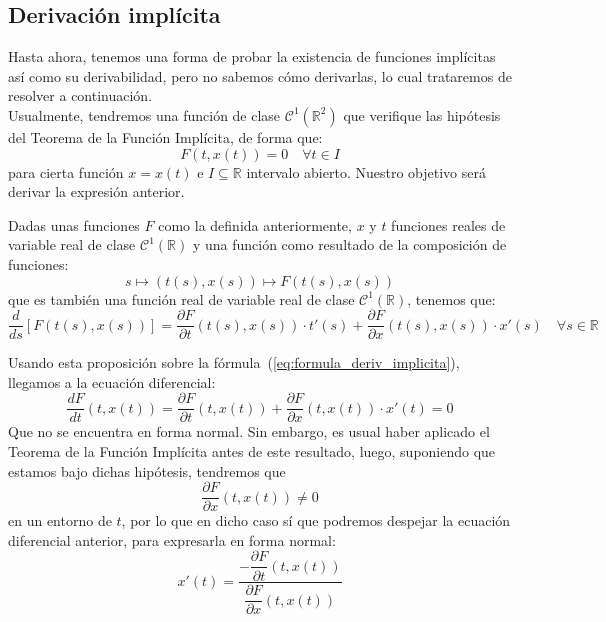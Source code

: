 \subsection{Derivación implícita}
Hasta ahora, tenemos una forma de probar la existencia de funciones implícitas así como su derivabilidad, pero no sabemos cómo derivarlas, lo cual trataremos de resolver a continuación.\\

\noindent
Usualmente, tendremos una función
de clase $\mathcal{C}^1(\mathbb{R}^2)$ que verifique las hipótesis del Teorema de la Función Implícita, de forma que:
\begin{equation}\label{eq:formula_deriv_implicita}
    F(t,x(t)) = 0 \quad \forall t\in I
\end{equation}
para cierta función $x=x(t)$ e $I\subseteq \mathbb{R}$ intervalo abierto. Nuestro objetivo será derivar la expresión anterior.

\begin{prop}
    Dadas unas funciones $F$ como la definida anteriormente, $x$ y $t$ funciones reales de variable real de clase $\mathcal{C}^1(\mathbb{R})$ y una función como resultado de la composición de funciones:
    \begin{equation*}
        s \longmapsto (t(s), x(s)) \longmapsto F(t(s), x(s))
    \end{equation*}
    que es también una función real de variable real de clase $\mathcal{C}^1(\mathbb{R})$, tenemos que:
    \begin{equation*}
        \dfrac{d}{ds}[ F(t(s),x(s))] = \dfrac{\partial F}{\partial t}(t(s), x(s))\cdot t'(s) + \dfrac{\partial F}{\partial x}(t(s),x(s))\cdot x'(s) \quad \forall s\in \mathbb{R}
    \end{equation*}
\end{prop}

\noindent
Usando esta proposición sobre la fórmula~(\ref{eq:formula_deriv_implicita}), llegamos a la ecuación diferencial:
\begin{equation*}
    \dfrac{dF}{dt}(t,x(t)) = \dfrac{\partial F}{\partial t}(t,x(t)) + \dfrac{\partial F}{\partial x}(t,x(t))\cdot x'(t) = 0
\end{equation*}
Que no se encuentra en forma normal. Sin embargo, es usual haber aplicado el Teorema de la Función Implícita antes de este resultado, luego, suponiendo que estamos bajo dichas hipótesis, tendremos que 
\begin{equation*}
    \dfrac{\partial F}{\partial x}(t,x(t)) \neq 0
\end{equation*}
en un entorno de $t$, por lo que en dicho caso sí que podremos despejar la ecuación diferencial anterior, para expresarla en forma normal:
\begin{equation*}
    x'(t) = \dfrac{-\dfrac{\partial F}{\partial t}(t,x(t))}{\dfrac{\partial F}{\partial x}(t,x(t))}
\end{equation*}


